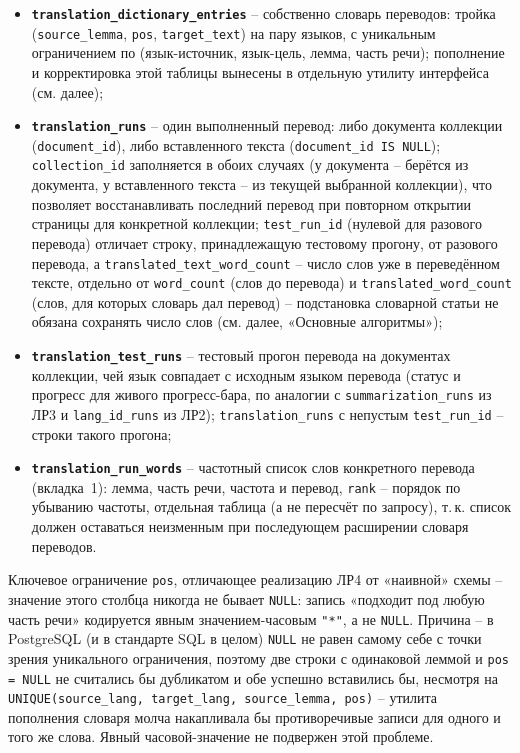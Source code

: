 \begin{itemize}
  \item \textbf{\texttt{translation\_dictionary\_entries}} -- собственно
  словарь переводов: тройка (\texttt{source\_lemma}, \texttt{pos},
  \texttt{target\_text}) на пару языков, с уникальным ограничением по
  (язык-источник, язык-цель, лемма, часть речи); пополнение и
  корректировка этой таблицы вынесены в отдельную утилиту интерфейса
  (см. далее);
  \item \textbf{\texttt{translation\_runs}} -- один выполненный перевод:
  либо документа коллекции (\texttt{document\_id}), либо вставленного
  текста (\texttt{document\_id IS NULL}); \texttt{collection\_id}
  заполняется в обоих случаях (у документа -- берётся из документа, у
  вставленного текста -- из текущей выбранной коллекции), что позволяет
  восстанавливать последний перевод при повторном открытии страницы для
  конкретной коллекции; \texttt{test\_run\_id} (нулевой для разового
  перевода) отличает строку, принадлежащую тестовому прогону, от
  разового перевода, а \texttt{translated\_text\_word\_count} -- число
  слов уже в переведённом тексте, отдельно от \texttt{word\_count}
  (слов до перевода) и \texttt{translated\_word\_count} (слов, для
  которых словарь дал перевод) -- подстановка словарной статьи не
  обязана сохранять число слов (см. далее, «Основные алгоритмы»);
  \item \textbf{\texttt{translation\_test\_runs}} -- тестовый прогон
  перевода на документах коллекции, чей язык совпадает с исходным
  языком перевода (статус и прогресс для живого прогресс-бара, по
  аналогии с \texttt{summarization\_runs} из ЛР3 и
  \texttt{lang\_id\_runs} из ЛР2); \texttt{translation\_runs} с
  непустым \texttt{test\_run\_id} -- строки такого прогона;
  \item \textbf{\texttt{translation\_run\_words}} -- частотный список
  слов конкретного перевода (вкладка~1): лемма, часть речи, частота и
  перевод, \texttt{rank} -- порядок по убыванию частоты, отдельная
  таблица (а не пересчёт по запросу), т.\,к. список должен оставаться
  неизменным при последующем расширении словаря переводов.
\end{itemize}

Ключевое ограничение \texttt{pos}, отличающее реализацию ЛР4 от
«наивной» схемы -- значение этого столбца никогда не бывает
\texttt{NULL}: запись «подходит под любую часть речи» кодируется явным
значением-часовым \texttt{"*"}, а не \texttt{NULL}. Причина -- в
PostgreSQL (и в стандарте SQL в целом) \texttt{NULL} не равен
самому себе с точки зрения уникального ограничения, поэтому две
строки с одинаковой леммой и \texttt{pos = NULL} не считались бы
дубликатом и обе успешно вставились бы, несмотря на
\texttt{UNIQUE(source\_lang, target\_lang, source\_lemma, pos)} --
утилита пополнения словаря молча накапливала бы противоречивые
записи для одного и того же слова. Явный часовой-значение не подвержен
этой проблеме.

